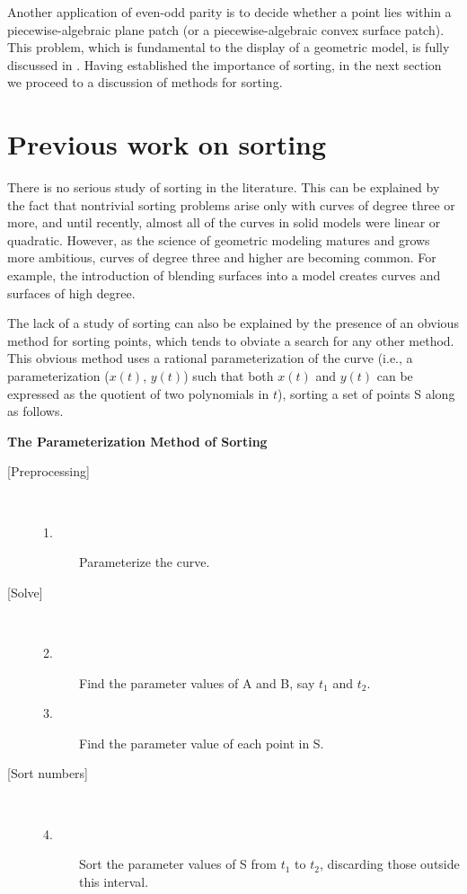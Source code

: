 Another application of even-odd parity 
is to decide whether a point lies within a piecewise-algebraic plane patch
(or a piecewise-algebraic convex surface patch).
This problem, which is fundamental to the display of a geometric model, 
is fully discussed in \cite{jj}.
Having established the importance of sorting, in the next section 
we proceed to a discussion of methods for sorting.

\section{Previous work on sorting}
\label{sp}
%
There is no serious study of sorting in the literature.
This can be explained by the fact that nontrivial sorting problems
arise only with curves of degree three or more, and until recently, 
almost all of the curves in solid models were linear or quadratic.  
However, as the science of geometric modeling matures and grows more
ambitious, curves of degree three and higher are becoming common.
For example, the introduction of blending surfaces \cite{hh87}
into a model creates curves and surfaces of high degree.

The lack of a study of sorting can also be explained 
by the presence of an obvious method for sorting points, 
which tends to obviate a search for any other method.
This obvious method uses a rational parameterization of the curve
(i.e., a parameterization ($x(t)$, $y(t)$) such that both 
$x(t)$ and $y(t)$ can be expressed as the quotient of two polynomials in $t$),
sorting a set of points S along  as follows.

\vspace{.2in}

\begin{center}{\bf The Parameterization Method of Sorting}\end{center}
\begin{description}
\item[{[Preprocessing]}] \ \ \ 
\begin{description}
\item[1.] Parameterize the curve.
\end{description}
%
\item[{[Solve]}] \ \ \ 
\begin{description}
\item[2.]
	Find the parameter values of A and B, say $t_{1}$ and $t_{2}$.
\item[3.]
	Find the parameter value of each point in S.
\end{description}
%
\item[{[Sort numbers]}] \ \ \ 
\begin{description}
\item[4.]
	Sort the parameter values of S from $t_{1}$ to $t_{2}$, discarding
	those outside this interval.
\end{description}
\end{description}

